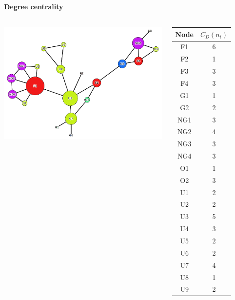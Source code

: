 \documentclass[8pt]{beamer}
\begin{document}
\begin{frame}
\frametitle{\insertsection}
\framesubtitle{Degree centrality}

\begin{columns}[c]
    \includegraphics[width=\linewidth,height=\textheight,keepaspectratio]{exercise_degree_gephi}

\centering
\scriptsize
\begin{table}
\centering
\begin{tabular}{cc}
\bottomrule 
Node & $C_{D}(n_{i})$ \\
\hline
F1   & 6      \\
F2   & 1      \\
F3   & 3      \\
F4   & 3      \\
G1   & 1      \\
G2   & 2      \\
NG1  & 3      \\
NG2  & 4      \\
NG3  & 3      \\
NG4  & 3      \\
O1   & 1      \\
O2   & 3      \\
U1   & 2      \\
U2   & 2      \\
U3   & 5      \\
U4   & 3      \\
U5   & 2      \\
U6   & 2      \\
U7   & 4      \\
U8   & 1      \\
U9   & 2   \\
\bottomrule   
\end{tabular}
\end{table}
\end{columns}
   
\end{frame}
\end{document}
